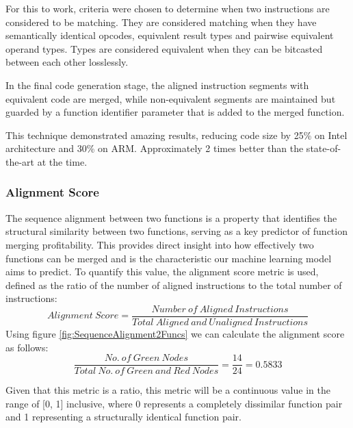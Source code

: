 For this to work, criteria were chosen to determine when two instructions are considered to be matching. They are considered matching when they have semantically identical opcodes, equivalent result types and pairwise equivalent operand types. Types are considered equivalent when they can be bitcasted between each other losslessly.

In the final code generation stage, the aligned instruction segments with equivalent code are merged, while non-equivalent segments are maintained but guarded by a function identifier parameter that is added to the merged function.


This technique demonstrated amazing results, reducing code size by 25\% on Intel architecture and 30\% on ARM. Approximately 2 times better than the state-of-the-art at the time.

\subsubsection{Alignment Score} \label{METRIC:AlignmentScore}
The sequence alignment between two functions is a property that identifies the structural similarity between two functions, serving as a key predictor of function merging profitability. This provides direct insight into how effectively two functions can be merged and is the characteristic our machine learning model aims to predict.
To quantify this value, the alignment score metric is used, defined as the ratio of the number of aligned instructions to the total number of instructions:
$$Alignment\ Score = \frac{Number\ of\ Aligned\ Instructions}{Total\ Aligned\ and\ Unaligned\ Instructions}$$
Using figure \ref{fig:SequenceAlignment2Funcs} we can calculate the alignment score as follows:
$$\frac{No.\ of\ Green\ Nodes}{Total\ No.\ of\ Green\ and\ Red\ Nodes}=\frac{14}{24} = 0.5833$$

Given that this metric is a ratio, this metric will be a continuous value in the range of [0, 1] inclusive, where 0 represents a completely dissimilar function pair and 1 representing a structurally identical function pair.


